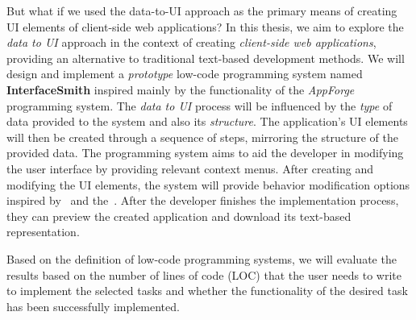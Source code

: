 But what if we used the data-to-UI approach as the primary means of creating UI elements of client-side web applications?
In this thesis, we aim to explore the \emph{data to UI} approach in the context of creating \emph{client-side web applications}, providing an alternative to traditional text-based development methods.
We will design and implement a \emph{prototype} low-code programming system named \textbf{InterfaceSmith} inspired mainly by the functionality of the \emph{AppForge} programming system.
The \emph{data to UI} process will be influenced by the \emph{type} of data provided to the system and also its \emph{structure}.
The application's UI elements will then be created through a sequence of steps, mirroring the structure of the provided data.
The programming system aims to aid the developer in modifying the user interface by providing relevant context menus.
After creating and modifying the UI elements, the system will provide behavior modification options inspired by~\citet{elm} and the~\citet{elm-arch}.
After the developer finishes the implementation process, they can preview the created application and download its text-based representation.

Based on the definition of low-code programming systems, we will evaluate the results based on the number of lines of code (LOC) that the user needs to write to implement the selected tasks and whether the functionality of the desired task has been successfully implemented.

\medskip
